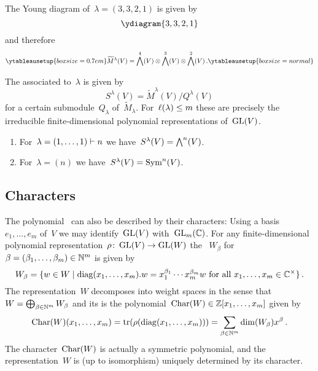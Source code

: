 \documentclass[a4paper,10pt]{scrartcl}
\begin{document}
\begin{example}
  The Young diagram of~$\lambda = (3,3,2,1)$ is given by
  \[
    \ydiagram{3,3,2,1}
  \]
  and therefore
  \[
    \ytableausetup{boxsize=0.7em}
    \widetilde{M}^{\lambda}(V)
    =
    \Exterior^4(V) \tensor \Exterior^3(V) \tensor \Exterior^2(V) \,.
    \ytableausetup{boxsize=normal}
  \]
\end{example}

The  associated to~$\lambda$ is given by
\[
  S^{\lambda}(V)
  =
  \widetilde{M}^{\lambda}(V)/Q^{\lambda}(V)
\]
for a certain submodule~$Q_\lambda$ of~$\widetilde{M}_\lambda$.
For~$\operatorname{\ell}(\lambda) \leq m$ these are precisely the irreducible finite-dimensional polynomial representations of~$\operatorname{GL}(V)$.

\begin{example}
  \leavevmode
  \begin{enumerate}
    \item
      For~$\lambda = (1, \dotsc, 1) \vdash n$ we have~$S^{\lambda}(V) = \bigwedge^n(V)$.
    \item
      For~$\lambda = (n)$ we have~$S^{\lambda}(V) = \operatorname{Sym}^n(V)$.
  \end{enumerate}
\end{example}



\subsection{Characters}

The polynomial~{} can also be described by their characters:
Using a basis~$e_1, \dotsc, e_m$ of~$V$ we may identify~$\operatorname{GL}(V)$ with~$\operatorname{GL}_m(\mathbb{C})$.
For any finite-dimensional polynomial representation~$\rho \colon \operatorname{GL}(V) \to \operatorname{GL}(W)$ the ~$W_\beta$ for~$\beta = (\beta_1, \dotsc, \beta_m) \in \mathbb{N}^m$ is given by
\[
  W_\beta
  =
  \{
    w \in W
  \suchthat
    \text{$\diag(x_1, \dotsc, x_m).w = x_1^{\beta_1} \dotsm x_m^{\beta_m} w$ for all~$x_1, \dotsc, x_m \in \Complex^{\times}$}
  \} \,.
\]
The representation~$W$ decomposes into weight spaces in the sense that~$W = \bigoplus_{\beta \in \mathbb{N}^m} W_\beta$ and its  is the polynomial~$\operatorname{Char}(W) \in \mathbb{Z}[x_1, \dotsc, x_m]$ given by
\[
  \operatorname{Char}(W)(x_1, \dotsc, x_m)
  =
  \operatorname{tr}(\rho(\operatorname{diag}(x_1, \dotsc, x_m)))
  =
  \sum_{\beta \in \mathbb{N}^m} \dim(W_\beta) x^\beta \,.
\]
The character~$\operatorname{Char}(W)$ is actually a symmetric polynomial, and the representation~$W$ is (up to isomorphism) uniquely determined by its character.
\end{document}
